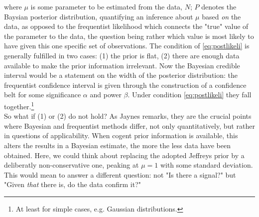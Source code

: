 \documentclass[aps,prb,twocolumn,showpacs,superscriptaddress,groupedaddress]{revtex4}  %
\begin{document}
where $\mu$ is some parameter to be estimated from the data, $N$; $P$ denotes the Baysian posterior distribution, quantifying an inference about $\mu$ based \emph{on} the data, as opposed to the frequentist likelihood which connects the "true" value of the parameter to the data, the question being rather which value is most likely to have given this one specific set of observations. The condition of \ref{eq:postlikeli} is generally fulfilled in two cases: (1) the prior is flat, (2) there are enough data available to make the prior information irrelevant. Now the Bayesian credible interval would be a statement on the width of the posterior distribution: the frequentist confidence interval is given through the construction of a confidence belt for some significance $\alpha$ and power $\beta$. Under condition \ref{eq:postlikeli} they fall together.\footnote{At least for simple cases, e.g. Gaussian distributions.}\\
So what if (1) or (2) do not hold? As Jaynes remarks, they are the crucial points where Bayesian and frequentist methods differ, not only quantitatively, but rather in questions of applicability. When cogent prior information is available, this alters the results in a Bayesian estimate, the more the less data have been obtained. Here, we could think about replacing the adopted Jeffreys prior by a deliberatly non-conservative one, peaking at $\mu=1$ with some standard deviation. This would mean to answer a different question: not "Is there a signal?" but "Given \emph{that} there is, do the data confirm it?"
\end{document}
